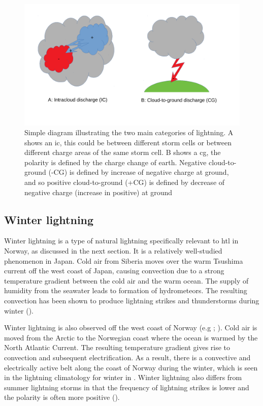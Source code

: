 \begin{figure}
    \centering
    \includegraphics[width=\textwidth]{Figures/lyntyper.pdf}
    \caption{Simple diagram illustrating the two main categories of lightning. A shows an \acrfull{ic}, this could be between different storm cells or between different charge areas of the same storm cell. B shows a \acrfull{cg}, the polarity is defined by the charge change of earth. Negative cloud-to-ground (-CG) is defined by increase of negative charge at ground, and so positive cloud-to-ground (+CG) is defined by decrease of negative charge (increase in positive) at ground}
    \label{fig:lyntyper}
\end{figure}

\subsection{Winter lightning}\label{sec:winter lightning}
Winter lightning is a type of natural lightning specifically relevant to \acrshort{htl} in Norway, as discussed in the next section. It is a relatively well-studied phenomenon in Japan. Cold air from Siberia moves over the warm Tsushima current off the west coast of Japan, causing convection due to a strong temperature gradient between the cold air and the warm ocean. The supply of humidity from the seawater leads to formation of hydrometeors. The resulting convection has been shown to produce lightning strikes and thunderstorms during winter (\cite{michimoto2007}).

Winter lightning is also observed off the west coast of Norway (e.g \cite{march2016}; \cite{koeltzow2018}). Cold air is moved from the Arctic to the Norwegian coast where the ocean is warmed by the North Atlantic Current. The resulting temperature gradient gives rise to convection and subsequent electrification. As a result, there is a convective and electrically active belt along the coast of Norway during the winter, which is seen in the lightning climatology for winter in \cite{koeltzow2018}. Winter lightning also differs from summer lightning storms in that the frequency of lightning strikes is lower and the polarity is often more positive (\cite{michimoto2007}).
 
